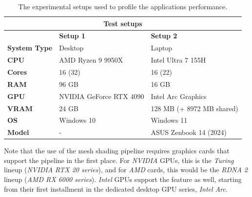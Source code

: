 \begin{table}[h]          %
  \centering
    \begin{tabular}{|lll|}
        \hline
        \multicolumn{3}{|c|}{\textbf{Test setups}}                                                                              \\ \hline
        \multicolumn{1}{|l|}{}                     & \multicolumn{1}{l|}{\textbf{Setup 1}}          & \textbf{Setup 2}          \\ \hline
        \multicolumn{1}{|l|}{\textbf{System Type}} & \multicolumn{1}{l|}{Desktop}                   & Laptop                    \\
        \multicolumn{1}{|l|}{\textbf{CPU}}         & \multicolumn{1}{l|}{AMD Ryzen 9 9950X}         & Intel Ultra 7 155H        \\
        \multicolumn{1}{|l|}{\textbf{Cores}}       & \multicolumn{1}{l|}{16 (32)}                   & 16 (22)                   \\
        \multicolumn{1}{|l|}{\textbf{RAM}}         & \multicolumn{1}{l|}{96 GB}                     & 16 GB                     \\
        \multicolumn{1}{|l|}{\textbf{GPU}}         & \multicolumn{1}{l|}{NVIDIA GeForce RTX 4090}   & Intel Arc Graphics        \\
        \multicolumn{1}{|l|}{\textbf{VRAM}}        & \multicolumn{1}{l|}{24 GB}                     & 128 MB (+ 8972 MB shared) \\
        \multicolumn{1}{|l|}{\textbf{OS}}          & \multicolumn{1}{l|}{Windows 10}                & Windows 11                \\
        \multicolumn{1}{|l|}{\textbf{Model}}       & \multicolumn{1}{l|}{-}                         & ASUS Zenbook 14 (2024)    \\ \hline
    \end{tabular}
    \caption{The experimental setups used to profile the applications performance.}
    \label{tbl:hardware-setup}
\end{table}

\noindent
Note that the use of the mesh shading pipeline requires graphics cards that support the pipeline in the first place. 
For \emph{NVIDIA} \ac{GPU}s, this is the \emph{Turing} lineup (\emph{NVIDIA RTX 20 series}), and for \emph{AMD} cards, 
this would be the \emph{RDNA 2} lineup (\emph{AMD RX 6000 series}). \emph{Intel} \ac{GPU}s support the feature as 
well, starting from their first installment in the dedicated desktop \ac{GPU} series, \emph{Intel Arc}. \\


